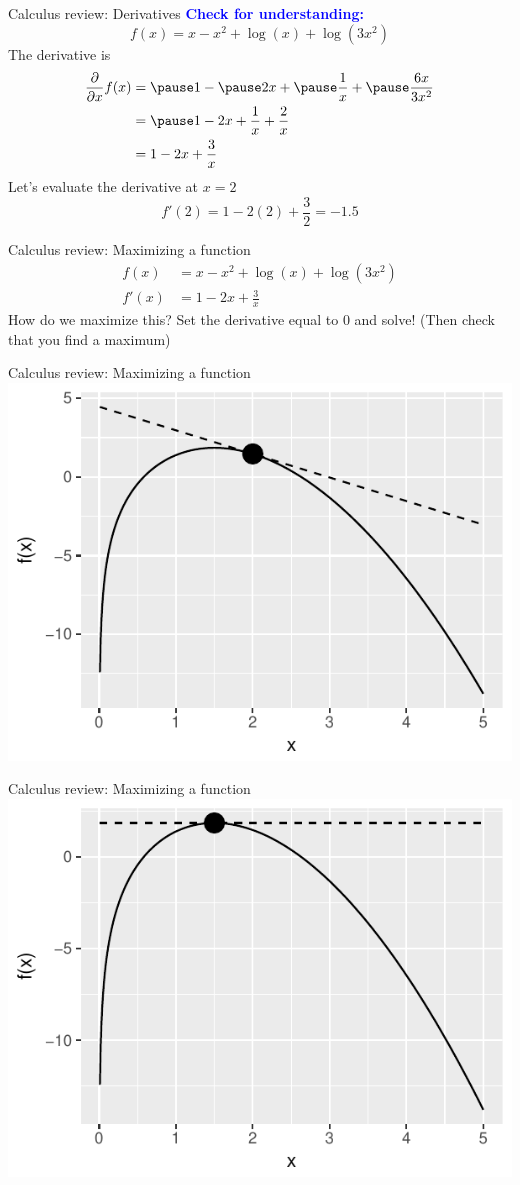 \documentclass{beamer}
\newcommand{\bblue}[1]{\textbf{\textcolor{blue}{#1}}}
\begin{document}
\begin{frame}{Calculus review: Derivatives}
\bblue{Check for understanding:}
$$f(x) = x - x^2 + \log(x) + \log(3x^2)$$
The derivative is
$$\begin{aligned}
\frac{\partial}{\partial x} f(x) &= \pause 1 - \pause 2x + \pause \frac{1}{x} + \pause \frac{6x}{3x^2} \\
&= \pause 1 - 2x + \frac{1}{x} + \frac{2}{x} \\
&= 1 - 2x + \frac{3}{x}
\end{aligned}$$
Let's evaluate the derivative at $x = 2$ \pause \\
$$f'(2) = 1 - 2(2) + \frac{3}{2} = -1.5$$
\end{frame}

\begin{frame}{Calculus review: Maximizing a function}
$$\begin{aligned}
f(x) &= x - x^2 + \log(x) + \log(3x^2) \\
f'(x) &= 1 - 2x + \frac{3}{x}
\end{aligned}$$
How do we maximize this? \pause \vskip 1cm
Set the derivative equal to 0 and solve! \pause \vskip 1cm
(Then check that you find a maximum) 
\end{frame}

\begin{frame}{Calculus review: Maximizing a function}
\centering \includegraphics[width = .8\textwidth]{figs/ToMaximize2.pdf}
\end{frame}

\begin{frame}{Calculus review: Maximizing a function}
\centering \includegraphics[width = .8\textwidth]{figs/ToMaximize3.pdf}
\end{frame}
\end{document}
